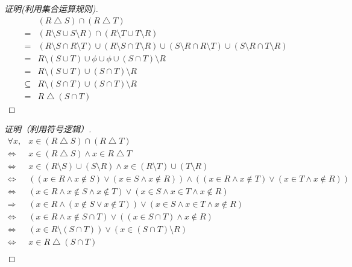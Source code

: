 \documentclass{article}
\begin{document}
\begin{CJK}{UTF8}{gbsn}
\begin{proof}[证明(利用集合运算规则)]
  \begin{equation*}
    \begin{split}
  &(R\bigtriangleup S)\cap (R\bigtriangleup T)\\
  =&(R\setminus S \cup S\setminus R) \cap (R\setminus T \cup T\setminus R)\\
  =&(R\setminus S \cap R\setminus T)\cup (R\setminus S\cap T\setminus R)\cup (S\setminus R\cap R\setminus T)\cup (S\setminus R\cap T\setminus R)\\
  =&R\setminus (S\cup T)\cup \phi \cup \phi \cup (S\cap T)\setminus R\\
  =&R\setminus (S\cup T)\cup  (S\cap T)\setminus R\\
  \subseteq &R\setminus (S\cap T) \cup (S\cap T)\setminus R\\
  =&R\bigtriangleup (S\cap T)
\end{split}
\end{equation*}
\end{proof}
\begin{proof}[证明（利用符号逻辑）]
    \begin{equation*}
    \begin{split}
      \forall x, &x \in (R\bigtriangleup S)\cap (R\bigtriangleup T) \\
      \Leftrightarrow& x \in (R\bigtriangleup S) \land x\in R\bigtriangleup T\\
      \Leftrightarrow& x \in (R\setminus S)\cup (S\setminus R) \land x\in (R\setminus T)\cup (T\setminus R)\\
      \Leftrightarrow& ((x \in R \land x\notin S) \lor (x \in S \land x \notin R))\land ((x\in R \land x\notin T)\lor (x\in T \land x \notin R))\\
      \Leftrightarrow& (x \in R \land x \notin S  \land x\notin T) \lor (x \in S \land x \in T \land x\notin R)\\
      \Rightarrow & (x \in R \land (x\notin S \lor x\notin T)) \lor (x \in S \land x \in T \land x\notin R)\\
      \Leftrightarrow& (x \in R \land x \notin S\cap T)\lor ((x\in S\cap T)\land x\notin R)\\
      \Leftrightarrow& (x \in R  \setminus (S\cap T))\lor (x\in (S\cap T)\setminus R)\\
      \Leftrightarrow& x \in R  \bigtriangleup (S\cap T)\\      
    \end{split}
  \end{equation*}


\end{proof}
\end{CJK}
\end{document}
